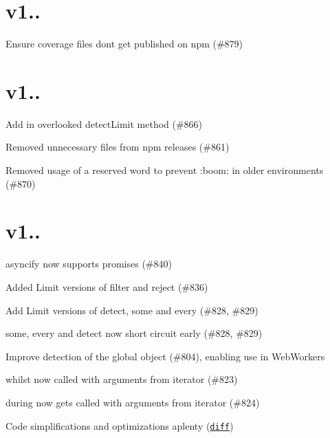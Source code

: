 \section*{v1..}


\begin{DoxyItemize}
\item Ensure coverage files don\textquotesingle{}t get published on npm (\#879)
\end{DoxyItemize}

\section*{v1..}


\begin{DoxyItemize}
\item Add in overlooked {\ttfamily detect\+Limit} method (\#866)
\item Removed unnecessary files from npm releases (\#861)
\item Removed usage of a reserved word to prevent \+:boom\+: in older environments (\#870)
\end{DoxyItemize}

\section*{v1..}


\begin{DoxyItemize}
\item {\ttfamily asyncify} now supports promises (\#840)
\item Added {\ttfamily Limit} versions of {\ttfamily filter} and {\ttfamily reject} (\#836)
\item Add {\ttfamily Limit} versions of {\ttfamily detect}, {\ttfamily some} and {\ttfamily every} (\#828, \#829)
\item {\ttfamily some}, {\ttfamily every} and {\ttfamily detect} now short circuit early (\#828, \#829)
\item Improve detection of the global object (\#804), enabling use in Web\+Workers
\item {\ttfamily whilst} now called with arguments from iterator (\#823)
\item {\ttfamily during} now gets called with arguments from iterator (\#824)
\item Code simplifications and optimizations aplenty (\href{https://github.com/caolan/async/compare/v1.3.0...v1.4.0}{\tt diff})
\end{DoxyItemize}

